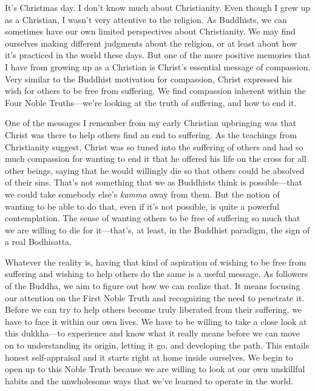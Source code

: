 
It's Christmas day. I don't know much about Christianity. Even though I 
grew up as a Christian, I wasn't very attentive to the religion. As 
Buddhists, we can sometimes have our own limited perspectives about 
Christianity. We may find ourselves making different judgments about 
the religion, or at least about how it's practiced in the world these 
days. But one of the more positive memories that I have from growing up 
as a Christian is Christ's essential message of compassion. Very 
similar to the Buddhist motivation for compassion, Christ expressed his 
wish for others to be free from suffering. We find compassion inherent 
within the Four Noble Truths---we're looking at the truth of suffering, 
and how to end it.

One of the messages I remember from my early Christian upbringing was 
that Christ was there to help others find an end to suffering. As the 
teachings from Christianity suggest, Christ was so tuned into the 
suffering of others and had so much compassion for wanting to end it 
that he offered his life on the cross for all other beings, saying that 
he would willingly die so that others could be absolved of their sins. 
That's not something that we as Buddhists think is possible---that we 
could take somebody else's \emph{kamma} away from them. But the notion 
of wanting to be able to do that, even if it's not possible, is quite a 
powerful contemplation. The sense of wanting others to be free of 
suffering so much that we are willing to die for it---that's, at least, 
in the Buddhist paradigm, the sign of a real Bodhisatta.

Whatever the reality is, having that kind of aspiration of wishing to 
be free from suffering and wishing to help others do the same is a 
useful message. As followers of the Buddha, we aim to figure out how we 
can realize that. It means focusing our attention on the First Noble 
Truth and recognizing the need to penetrate it. Before we can try to 
help others become truly liberated from their suffering, we have to 
face it within our own lives. We have to be willing to take a close 
look at this dukkha---to experience and know what it really means 
before we can move on to understanding its origin, letting it go, and 
developing the path. This entails honest self-appraisal and it starts 
right at home inside ourselves. We begin to open up to this Noble Truth 
because we are willing to look at our own unskillful habits and the 
unwholesome ways that we've learned to operate in the world.

